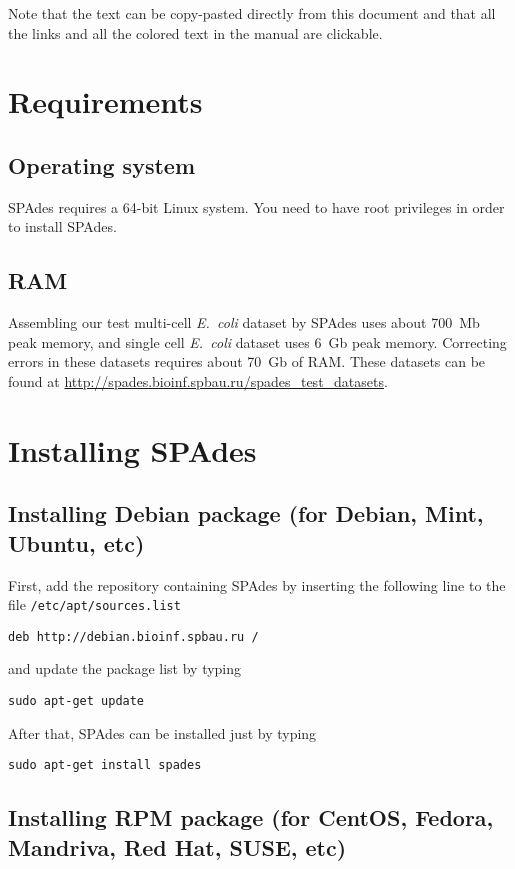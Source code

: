 \documentclass{article}
\def\spades{SPAdes}
\def\ecoli{\it E.~coli}
\begin{document}
Note that the text can be copy-pasted directly from this document
and that all the links and all the colored text in the manual are clickable.


\section{Requirements}
\subsection{Operating system}
{\spades} requires a 64-bit Linux system.
You need to have root privileges in order to install {\spades}.

\subsection{RAM}
Assembling our test multi-cell {\ecoli} dataset 
by {\spades} uses about 700~Mb peak memory, and single cell
{\ecoli} dataset uses 6~Gb peak memory. 
Correcting errors in these datasets requires about 70~Gb of RAM.
These datasets can be found at \url{http://spades.bioinf.spbau.ru/spades_test_datasets}.

\section{Installing {\spades}}
\subsection{Installing Debian package (for Debian, Mint, Ubuntu, etc)}
First, add the repository containing {\spades} by inserting the following line
to the file {\tt /etc/apt/sources.list}
\begin{lstlisting}
deb http://debian.bioinf.spbau.ru /
\end{lstlisting}
and update the package list by typing
\begin{lstlisting}
sudo apt-get update
\end{lstlisting}
After that, {\spades} can be installed just by typing
\begin{lstlisting}
sudo apt-get install spades
\end{lstlisting}

\subsection{Installing RPM package (for CentOS, Fedora, Mandriva, Red Hat, SUSE, etc)}
\end{document}

